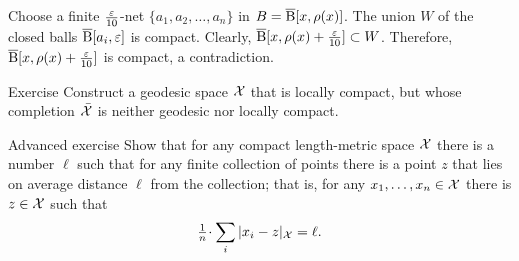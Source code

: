 Choose a finite $\tfrac{\varepsilon}{10}$-net $\{a_1,a_2,\dots,a_n\}$ in $B=\overline{\mathrm{B}}{}[x,\rho(x)]$.
The union $W$ of the closed balls $\overline{\mathrm{B}}{}[a_i,\varepsilon]$ is compact.
Clearly,
$\overline{\mathrm{B}}{}[x,\rho(x)+\frac{\varepsilon}{10}]\subset W$.
Therefore, $\overline{\mathrm{B}}{}[x,\rho(x)+\frac{\varepsilon}{10}]$ is compact,
a contradiction.
\qeds

\begin{thm}{Exercise}\label{exercise from BH}
Construct a geodesic space $\mathcal{X}$ that is locally compact,
but whose completion $\bar{\mathcal{X}}$ is neither geodesic nor locally compact.
\end{thm}


\begin{thm}{Advanced exercise}\label{ex:gross}
Show that for any compact length-metric space $\mathcal{X}$ there is a number $\ell$ such that for any finite collection of points there is a point $z$ that lies on average distance $\ell$ from the collection;
that is, for any $x_1,\dots,x_n\in \mathcal{X}$ there is $z\in \mathcal{X}$ such that
\[\tfrac1n\cdot\sum_i|x_i-z|_{\spc{X}}=\ell.\]
\end{thm}






